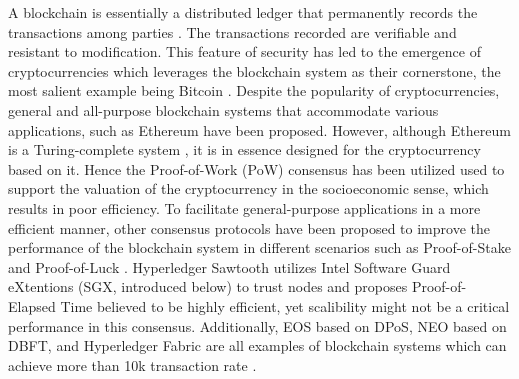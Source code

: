 %

A blockchain is essentially a distributed ledger that permanently records the transactions among parties \cite{iansiti2018truth}. The transactions recorded are verifiable and resistant to modification. This feature of security has led to the emergence of cryptocurrencies which leverages the blockchain system as their cornerstone, the most salient example being Bitcoin \cite{nakamoto2008bitcoin}. Despite the popularity of cryptocurrencies, general and all-purpose blockchain systems that accommodate various applications, such as Ethereum \cite{wood2014ethereum} have been proposed. However, although Ethereum is a Turing-complete system \cite{wood2014ethereum}, it is in essence designed for the cryptocurrency based on it. Hence the Proof-of-Work (PoW) consensus has been utilized used to support the valuation of the cryptocurrency in the socioeconomic sense, which results in poor efficiency. To facilitate general-purpose applications in a more efficient manner, other consensus protocols have been proposed to improve the performance of the blockchain system in different scenarios such as Proof-of-Stake \cite{kiayias2017ouroboros} and Proof-of-Luck \cite{milutinovic2016proof}. Hyperledger Sawtooth \cite{sawtooth} utilizes Intel Software Guard eXtentions (SGX, introduced below) to trust nodes and proposes Proof-of-Elapsed Time believed to be highly efficient, yet scalibility might not be a critical performance in this consensus. Additionally, EOS \cite{eosio} based on DPoS, NEO \cite{hoxha2018hashgraph} based on DBFT, and Hyperledger Fabric \cite{cachin2016architecture} are all examples of blockchain systems which can achieve more than 10k transaction rate \cite{bach2018comparative}.

